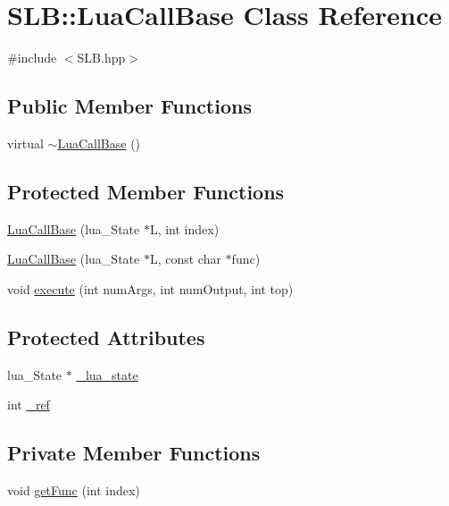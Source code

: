 \hypertarget{classSLB_1_1LuaCallBase}{}\section{S\+LB\+:\+:Lua\+Call\+Base Class Reference}
\label{classSLB_1_1LuaCallBase}


{\ttfamily \#include $<$S\+L\+B.\+hpp$>$}

\subsection*{Public Member Functions}
\begin{DoxyCompactItemize}
\item 
virtual \hyperlink{classSLB_1_1LuaCallBase_a01c63492d0246f66e2b960b1e0ebe9a3}{$\sim$\+Lua\+Call\+Base} ()
\end{DoxyCompactItemize}
\subsection*{Protected Member Functions}
\begin{DoxyCompactItemize}
\item 
\hyperlink{classSLB_1_1LuaCallBase_a5c532d43fb99270a9b409b29fcc293c1}{Lua\+Call\+Base} (lua\+\_\+\+State $\ast$L, int index)
\item 
\hyperlink{classSLB_1_1LuaCallBase_a573275f0ec210342898f2065cf791bd7}{Lua\+Call\+Base} (lua\+\_\+\+State $\ast$L, const char $\ast$func)
\item 
void \hyperlink{classSLB_1_1LuaCallBase_a1840800ae2df97d73bd58111a6897979}{execute} (int num\+Args, int num\+Output, int top)
\end{DoxyCompactItemize}
\subsection*{Protected Attributes}
\begin{DoxyCompactItemize}
\item 
lua\+\_\+\+State $\ast$ \hyperlink{classSLB_1_1LuaCallBase_aaaa717e06e31ebdbe45daa7fc80924d8}{\+\_\+lua\+\_\+state}
\item 
int \hyperlink{classSLB_1_1LuaCallBase_a8e4587275a3d61c64e146fd0750eee90}{\+\_\+ref}
\end{DoxyCompactItemize}
\subsection*{Private Member Functions}
\begin{DoxyCompactItemize}
\item 
void \hyperlink{classSLB_1_1LuaCallBase_a47165b105ace1bd0c1e5bdced68e07c1}{get\+Func} (int index)
\end{DoxyCompactItemize}
